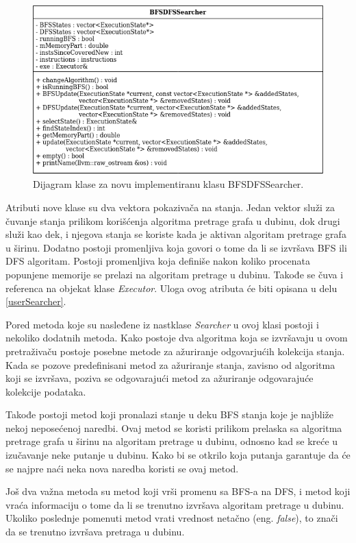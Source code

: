 \documentclass[12pt,oneside]{memoir}
\begin{document}
\begin{figure}[ht]
    \centering
    \includegraphics[width=\linewidth]{dijagram_klase.png}
    \caption{Dijagram klase za novu implementiranu klasu BFSDFSSearcher.}
    \label{fig:UML}
\end{figure}

Atributi nove klase su dva vektora pokazivača na stanja. Jedan vektor služi za čuvanje stanja prilikom korišćenja algoritma pretrage grafa u dubinu, dok drugi služi kao dek, i njegova stanja se koriste kada je aktivan algoritam pretrage grafa u širinu. Dodatno postoji promenljiva koja govori o tome da li se izvršava BFS ili DFS algoritam. Postoji promenljiva koja definiše nakon koliko procenata popunjene memorije se prelazi na algoritam pretrage u dubinu. Takođe se čuva i referenca na objekat klase \textit{Executor}. Uloga ovog atributa će biti opisana u delu \ref{userSearcher}.

Pored metoda koje su nasleđene iz nastklase \textit{Searcher} u ovoj klasi postoji i nekoliko dodatnih metoda. Kako postoje dva algoritma koja se izvršavaju u ovom pretraživaču postoje posebne metode za ažuriranje odgovarjućih kolekcija stanja. Kada se pozove predefinisani metod za ažuriranje stanja, zavisno od algoritma koji se izvršava, poziva se odgovarajući metod za ažuriranje odgovarajuće kolekcije podataka. 

Takođe postoji metod koji pronalazi stanje u deku BFS stanja koje je najbliže nekoj neposećenoj naredbi. Ovaj metod se koristi prilikom prelaska sa algoritma pretrage grafa u širinu na algoritam pretrage u dubinu, odnosno kad se kreće u izučavanje neke putanje u dubinu. Kako bi se otkrilo koja putanja garantuje da će se najpre naći neka nova naredba koristi se ovaj metod. 

Još dva važna metoda su metod koji vrši promenu sa BFS-a na DFS, i metod koji vraća informaciju o tome da li se trenutno izvršava algoritam pretrage u dubinu. Ukoliko poslednje pomenuti metod vrati vrednost netačno (eng. \textit{false}), to znači da se trenutno izvršava pretraga u dubinu.
\end{document}

